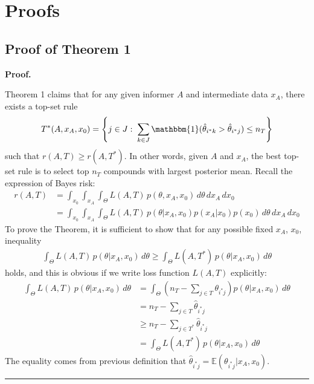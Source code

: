 \documentclass[12pt]{article}
\newenvironment{proof}[1][Proof]{\noindent\textbf{#1.} }{\ \rule{0.5em}{0.5em}}
\begin{document}
%
%

\appendix 

\section{Proofs}
\subsection{Proof of Theorem 1}
\begin{proof}

Theorem 1 claims that for any given informer $A$ and intermediate data $x_A$, there exists a top-set rule 
\begin{eqnarray*}
T^*(A,x_A,x_0) = \left\{ j \in J: \; \sum_{k\in J} \mathbbm{1}(\hat \theta_{i^*k} > \hat \theta_{i^*j}) \leq n_T \right\}
\end{eqnarray*}
such that  $r(A,T) \geq r(A, T^*)$. In other words, given $A$ and $x_A$, the best top-set rule is to select top $n_T$ compounds with largest posterior mean. Recall the expression of Bayes risk: 
\begin{align*}
r(A, T) 
&= \int_{x_0} \int_{x_A} \int_\Theta  L\left( A, T \right) \, 
p(\theta, x_A,x_0)\, d\theta \, d x_A \, d x_0\\
&= \int_{x_0} \int_{x_A} \int_\Theta  L\left( A, T \right) \, 
p(\theta |x_A,x_0)p(x_A|x_0)p(x_0)\, d\theta \, d x_A \, d x_0
\end{align*}
To prove the Theorem, it is sufficient to show that for any possible fixed $x_A$, $x_0$, inequality 
\begin{eqnarray}
\label{eq:inequal1}
\int_\Theta  L\left( A, T \right) \, 
p(\theta |x_A,x_0) \, d\theta \geq \int_\Theta  L\left( A, T^* \right) \, 
p(\theta |x_A,x_0) \, d\theta
\end{eqnarray}holds, and this is obvious if we write loss function $L(A,T)$ explicitly:
\begin{align*}
\int_\Theta  L\left( A, T \right) \, p(\theta |x_A,x_0) \, d\theta &= \int_\Theta  ( n_T - \sum_{j\in T} \theta_{i^*j}) 
p(\theta |x_A,x_0) \, d\theta\\
&= n_T - \sum_{j\in T} \hat \theta_{i^*j}\\
&\geq n_T - \sum_{j\in T^*}  \hat \theta_{i^*j}\\
&= \int_\Theta  L\left( A, T^* \right) \, 
p(\theta |x_A,x_0) \, d\theta
\end{align*}
The equality comes from previous definition that $\hat \theta_{i^*j} = \mathbb E(\theta_{i^*j}|x_A,x_0)$.
\end{proof}
\end{document}
